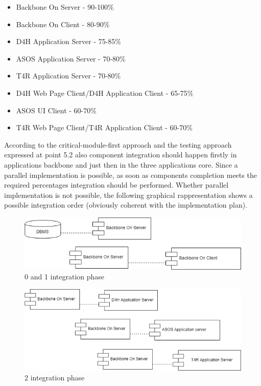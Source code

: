 \begin{itemize}
\item Backbone On Server - 90-100\%
\item Backbone On Client - 80-90\%
\item D4H Application Server - 75-85\% 
\item ASOS Application Server - 70-80\%
\item T4R Application Server - 70-80\%
\item D4H Web Page Client/D4H Application Client - 65-75\%
\item ASOS UI Client - 60-70\%
\item T4R Web Page Client/T4R Application Client - 60-70\%
\end{itemize}
According to the critical-module-first approach and the testing approach expressed at point 5.2 also component integration should happen firstly in applications backbone and just then in the three applications core. Since a parallel implementation is possible, as soon as components completion meets the required percentages integration should be performed. Whether parallel implementation is not possible, the following graphical rappresentation shows a possible integration order (obviously coherent with the implementation plan). 
\begin{figure}[H]
\caption{0 and 1 integration phase}
\includegraphics[width = \textwidth]{sections/implementationIntegrationTestGraphs/IntegrationOrder0-1phase.png}
\end{figure}
\begin{figure}[H]
\caption{2 integration phase}
\includegraphics[width = \textwidth]{sections/implementationIntegrationTestGraphs/IntegrationOrder2phase.png}
\end{figure}
